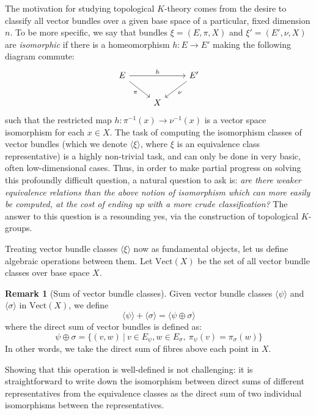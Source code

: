 \documentclass[aps,pra,showpacs,notitlepage,onecolumn,superscriptaddress,nofootinbib]{revtex4-1}
\theoremstyle{definition}
\newtheorem{remark}{Remark}[section]
\begin{document}
\noindent The motivation for studying topological $K$-theory comes from the desire to classify all vector bundles over a given base space of a particular, fixed dimension $n$.
To be more specific, we say that bundles $\xi = (E, \pi, X)$ and $\xi' = (E', \nu, X)$ are \emph{isomorphic} if there is a homeomorphism $h : E \rightarrow E'$ making the following diagram commute:
\[\begin{tikzcd}
E && {E'} \\
& X
\arrow["h", from=1-1, to=1-3]
\arrow["\nu", from=1-3, to=2-2]
\arrow["\pi"', from=1-1, to=2-2]
\end{tikzcd}\]
such that the restricted map $h : \pi^{-1}(x) \rightarrow \nu^{-1}(x)$ is a vector space isomorphism for each $x \in X$. The task of computing the isomorphism classes
of vector bundles (which we denote $\langle \xi \rangle$, where $\xi$ is an equivalence class representative) is a highly non-trivial task, and can only be done in very basic, often low-dimensional cases.
Thus, in order to make partial progress on solving this profoundly difficult question, a natural question to ask is: \emph{are there weaker equivalence relations than the above notion of isomorphism which can more easily be computed, at the cost
of ending up with a more crude classification?} The answer to this question is a resounding yes, via the construction of topological $K$-groups.
\newline

\noindent Treating vector bundle classes $\langle \xi \rangle$ now as fundamental objects, let us define algebraic operations between them. Let $\text{Vect}(X)$ be the set of all vector bundle classes
over base space $X$.

\begin{remark}[Sum of vector bundle classes]
  Given vector bundle classes $\langle \psi \rangle$ and $\langle \sigma \rangle$ in $\text{Vect}(X)$, we define
  \begin{equation}
    \langle \psi \rangle + \langle \sigma \rangle = \langle \psi \oplus \sigma \rangle
  \end{equation}
  where the direct sum of vector bundles is defined as:
  \begin{equation}
    \psi \oplus \sigma = \{ (v, w) \ | \ v \in E_{\psi}, w \in E_{\sigma}, \ \pi_{\psi}(v) = \pi_{\sigma}(w)\}
  \end{equation}
  In other words, we take the direct sum of fibres above each point in $X$.

  Showing that this operation is well-defined is not challenging: it is straightforward to write down the isomorphism between direct sums of different representatives from the equivalence classes as the
  direct sum of two individual isomorphisms between the representatives.
\end{remark}
\end{document}
